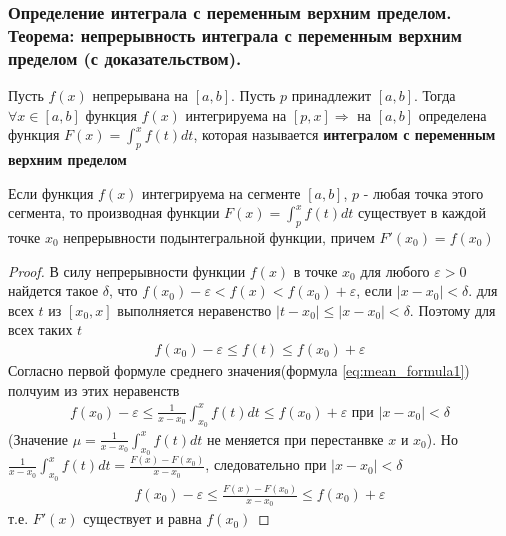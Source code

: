 \documentclass[10pt]{article}
\begin{document}
    \subsubsection{Определение интеграла с переменным верхним пределом. Теорема: непрерывность интеграла с переменным верхним пределом (с доказательством).}
    \begin{definition}
        Пусть $f(x)$ непрерывана на $[a, b]$. Пусть $p$ принадлежит $[a, b]$. Тогда $\forall x \in [a, b]$ функция $f(x)$ интегрируема на $[p, x] \Rightarrow$ на $[a, b]$ определена функция $F(x)=\int_p^x f(t) dt$, которая называется \textbf{интегралом с переменным верхним пределом}
    \end{definition}
    \begin{theorem}
        Если функция $f(x)$ интегрируема на сегменте $[a, b]$, $p$ - любая точка этого сегмента, то производная функции $F(x) = \int_p^x f(t) dt$ существует в каждой точке $x_0$ непрерывности подынтегральной функции, причем $F'(x_0) = f(x_0)$
    \end{theorem}
    \begin{proof}
        В силу непрерывности функции $f(x)$ в точке $x_0$ для любого $\varepsilon > 0$ найдется такое $\delta$, что $f(x_0) - \varepsilon < f(x) < f(x_0) + \varepsilon$, если $|x - x_0| < \delta$. для всех $t$ из $[x_0, x]$ выполняется неравенство $|t- x_0| \leq |x - x_0| < \delta$. Поэтому для всех таких $t$
        \begin{gather*}
            f(x_0) - \varepsilon \leq f(t) \leq f(x_0) + \varepsilon
        \end{gather*}
        Согласно первой формуле среднего значения(формула \ref{eq:mean_formula1}) полчуим из этих неравенств
        \begin{gather*}
            f(x_0) - \varepsilon \leq \frac{1}{x - x_0} \int_{x_0}^x f(t) dt \leq f(x_0) + \varepsilon \text{ при }|x - x_0| < \delta
        \end{gather*}
        (Значение $\mu = \frac{1}{x - x_0} \int_{x_0}^x f(t) dt$ не меняется при перестанвке $x$ и $x_0$). Но $\frac{1}{x - x_0} \int_{x_0}^x f(t) dt = \frac{F(x) - F(x_0)}{x - x_0}$, следовательно при $|x - x_0| < \delta$
        \begin{gather*}
            f(x_0) - \varepsilon \leq \frac{F(x) - F(x_0)}{x - x_0} \leq f(x_0) + \varepsilon
        \end{gather*}
        т.е. $F'(x)$ существует и равна $f(x_0)$
    \end{proof}
\end{document}
